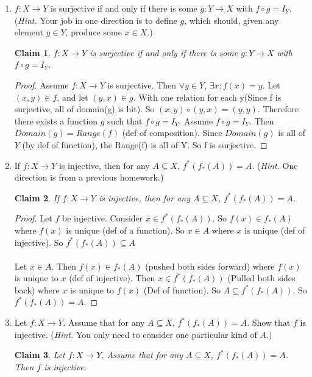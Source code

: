\documentclass[11pt]{letter}
\newtheorem{claim}{Claim}
\theoremstyle{definition}
\begin{document}
\begin{description}
\begin{enumerate}
\item $f:X\rightarrow Y$ is surjective if and only if there is some $g:Y\rightarrow X$ with $f\circ g=I_Y$. ({\em Hint.} Your job in one direction is to define $g$, which should, given any element $y\in Y$, produce some $x\in X$.)
  \begin{claim}
    $f:X\rightarrow Y$ is surjective if and only if there is some $g:Y\rightarrow X$ with $f\circ g=I_Y$.
  \end{claim}
  
  \begin{proof}
Assume $f:X\rightarrow Y$ is surjective. Then $\forall y\in Y$, $\exists x: f(x)=y$. Let $(x,y)\in f$, and let $(y,x)\in g$. With one relation for each y(Since f is surjective, all of domain(g) is hit). So $(x,y)\circ(y,x)=(y,y)$. Therefore there exists a function $g$ such that $f\circ g=I_Y$.
    Assume $f\circ g=I_Y$. Then $Domain(g)=Range(f)$ (def of composition). Since $Domain(g)$ is all of $Y$ (by def of function), the Range(f) is all of Y. So f is surjective.
  \end{proof}
  
\item If $f:X\rightarrow Y$ is injective, then for any $A\subseteq X$, $f^*(f_*(A))=A$. ({\em Hint.} One direction is from a previous homework.)
  \begin{claim}
    If $f:X\rightarrow Y$ is injective, then for any $A\subseteq X$, $f^*(f_*(A))=A$.
  \end{claim}
  \begin{proof}
    Let $f$ be injective. Consider $x\in f^*(f_*(A))$. So $f(x)\in f_*(A)$ where $f(x)$ is unique (def of a function). So $x\in A$ where $x$ is unique (def of injective). So $f^*(f_*(A))\subseteq A$\\ \\
    Let $x\in A$. Then $f(x)\in f_*(A)$ (pushed both sides forward) where $f(x)$ is unique to $x$ (def of injective). Then $x\in f^*(f_*(A))$ (Pulled both sides back) where $x$ is unique to $f(x)$ (Def of function). So $A\subseteq f^*(f_*(A))$. So $f^*(f_*(A))=A$.
    \end{proof}
  \item Let $f:X\rightarrow Y$. Assume that for any $A\subseteq X$, $f^*(f_*(A))=A$. Show that $f$ is injective. ({\em Hint.} You only need to consider one particular kind of $A$.)
    \begin{claim}
      Let $f:X\rightarrow Y$. Assume that for any $A\subseteq X$, $f^*(f_*(A))=A$. Then $f$ is injective.
    \end{claim}
    

\end{enumerate}
\end{description}
\end{document}
